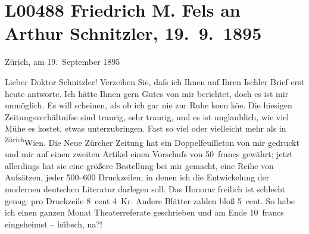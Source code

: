 

\section[Friedrich M. Fels an Arthur Schnitzler, 19. 9. 1895]{L00488 Friedrich M. Fels an Arthur Schnitzler, 19. 9. 1895}
\nopagebreak{}
\rehead{ }\normalsize\beginnumbering{}
\toendnotes[C]{\smallbreak\pagebreak[2]}
\toendnotes[C]{\smallbreak}
\pstart
           \raggedleft{}{\pb}Zürich, am 19. September 1895\pend
           
\pstart\center{}Lieber Doktor Schnitzler!\pend\vspace{0.5em}
\pstart
           Verzeihen Sie, daſs ich Ihnen auf Ihren Ischler
               Brief erst heute antworte. Ich hätte Ihnen gern Gutes von mir berichtet, doch es ist
               mir unmöglich. Es will scheinen, als ob ich gar nie zur Ruhe ko{\geminationm}en kö{\geminationn}e. Die hiesigen
               Zeitungsverhältniſse sind traurig, sehr traurig, und es ist unglaublich, wie viel
               Mühe es kostet, etwas unterzubringen. Fast so viel oder vielleicht mehr als in \substVorne{}\textsuperscript{Zürich}\substDazwischen{}Wien\substHinten{}. Die Neue Zürcher Zeitung hat ein Doppelfeuilleton von mir
               gedruckt und mir auf einen zweiten Artikel einen Vorschuſs von 50 francs gewährt;
               jetzt allerdings hat sie eine größere Bestellung bei mir gemacht, eine Reihe von
               Aufsätzen, jeder 500–600 Druckzeilen, in denen ich die Entwickelung der modernen
               deutschen Literatur darlegen soll. Das Honorar freilich ist schlecht genug: pro
               Druckzeile 8 cent 4 Kr. Andere Blätter zahlen bloß 5 cent. So habe ich einen ganzen
               Monat Theaterreferate geschrieben und am Ende 10 francs eingeheimst – hübsch,
               na?!\pend
           
